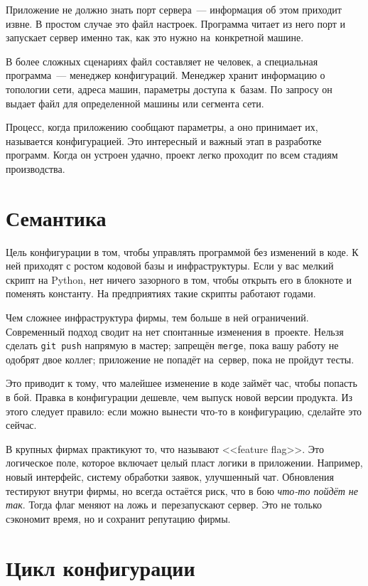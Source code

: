 Приложение не должно знать порт сервера~--- информация об этом приходит извне. В
простом случае это файл настроек. Программа читает из него порт и запускает
сервер именно так, как это нужно на~конкретной машине.


В более сложных сценариях файл составляет не человек, а специальная
программа~--- менеджер конфигураций. Менеджер хранит информацию о топологии
сети, адреса машин, параметры доступа к~базам. По запросу он выдает файл для
определенной машины или сегмента сети.

Процесс, когда приложению сообщают параметры, а оно принимает их, называется
конфигурацией. Это интересный и важный этап в разработке программ. Когда он
устроен удачно, проект легко проходит по всем стадиям производства.

\section{Семантика}

Цель конфигурации в том, чтобы управлять программой без изменений в коде. К ней
приходят с ростом кодовой базы и инфраструктуры. Если у вас мелкий скрипт на
Python, нет ничего зазорного в том, чтобы открыть его в блокноте и поменять
константу. На предприятиях такие скрипты работают годами.

Чем сложнее инфраструктура фирмы, тем больше в ней ограничений. Современный
подход сводит на нет спонтанные изменения в~проекте. Нельзя сделать \verb|git push|
напрямую в мастер; запрещён \verb|merge|, пока вашу работу не одобрят
двое коллег; приложение не попадёт на~сервер, пока не пройдут тесты.

Это приводит к тому, что малейшее изменение в коде займёт час, чтобы попасть в
бой. Правка в конфигурации дешевле, чем выпуск новой версии продукта. Из этого
следует правило: если можно вынести что-то в конфигурацию, сделайте это сейчас.


В крупных фирмах практикуют то, что называют <<feature flag>>. Это логическое
поле, которое включает целый пласт логики в приложении. Например, новый
интерфейс, систему обработки заявок, улучшенный чат. Обновления тестируют внутри
фирмы, но всегда остаётся риск, что в бою \emph{что-то пойдёт не так}. Тогда
флаг меняют на ложь и~перезапускают сервер. Это не только сэкономит время, но и
сохранит репутацию фирмы.

\section{Цикл конфигурации}

